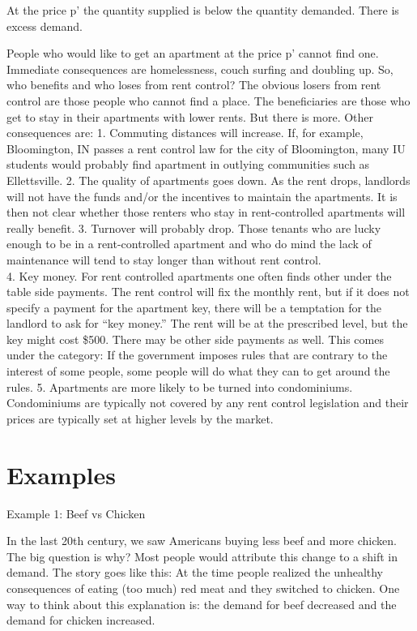 \documentclass[
]{book}
\begin{document}
At the price p' the quantity supplied is below the quantity demanded. There is excess demand.

People who would like to get an apartment at the price p' cannot find one. Immediate consequences are homelessness, couch surfing and doubling up. So, who benefits and who loses from rent control? The obvious losers from rent control are those people who cannot find a place. The beneficiaries are those who get to stay in their apartments with lower rents.
But there is more. Other consequences are:
1. Commuting distances will increase. If, for example, Bloomington, IN passes a rent control law for the city of Bloomington, many IU students would probably find apartment in outlying communities such as Ellettsville.
2. The quality of apartments goes down. As the rent drops, landlords will not have the funds and/or the incentives to maintain the apartments. It is then not clear whether those renters who stay in rent-controlled apartments will really benefit.
3. Turnover will probably drop. Those tenants who are lucky enough to be in a rent-controlled apartment and who do mind the lack of maintenance will tend to stay longer than without rent control.\\
4. Key money. For rent controlled apartments one often finds other under the table side payments. The rent control will fix the monthly rent, but if it does not specify a payment for the apartment key, there will be a temptation for the landlord to ask for ``key money.'' The rent will be at the prescribed level, but the key might cost \$500. There may be other side payments as well. This comes under the category: If the government imposes rules that are contrary to the interest of some people, some people will do what they can to get around the rules.
5. Apartments are more likely to be turned into condominiums. Condominiums are typically not covered by any rent control legislation and their prices are typically set at higher levels by the market.

\hypertarget{examples-2}{%
\section{Examples}\label{examples-2}}

Example 1: Beef vs Chicken

In the last 20th century, we saw Americans buying less beef and more chicken. The big question is why? Most people would attribute this change to a shift in demand. The story goes like this: At the time people realized the unhealthy consequences of eating (too much) red meat and they switched to chicken. One way to think about this explanation is: the demand for beef decreased and the demand for chicken increased.
\end{document}
